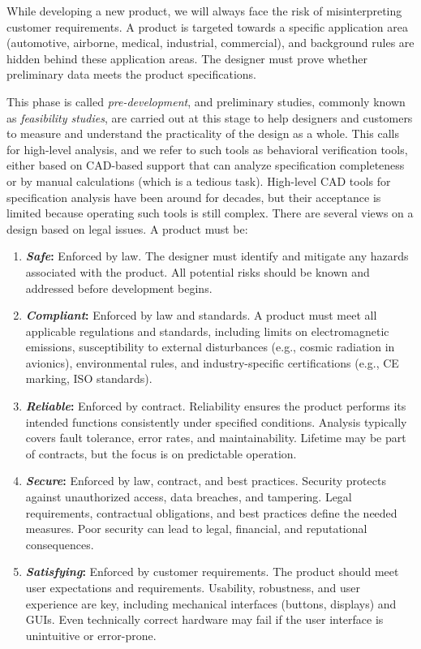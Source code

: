 While developing a new product, we will always face the risk of misinterpreting
customer requirements.
A product is targeted towards a specific application area (automotive, airborne,
medical, industrial, commercial), and background rules are hidden behind these
application areas.
The designer must prove whether preliminary data meets the product
specifications.

This phase is called \emph{pre-development}, and preliminary studies, commonly
known as \emph{feasibility studies}, are carried out at this stage to help
designers and customers to measure and understand the practicality of the
design as a whole.
This calls for high-level analysis, and we refer to such tools as behavioral
verification tools, either based on CAD-based support that can analyze
specification completeness or by manual calculations (which is a tedious task).
High-level CAD tools for specification analysis have been around for decades,
but their acceptance is limited because operating such tools is still complex.
There are several views on a design based on legal issues. A product must be:

\begin{enumerate}[topsep=8pt,itemsep=4pt,partopsep=4pt, parsep=4pt]
    \item \textbf{\emph{Safe}:} Enforced by law.
    The designer must identify and mitigate any hazards associated with the product.
    All potential risks should be known and addressed before development begins.

    \item \textbf{\emph{Compliant}:} Enforced by law and standards.
    A product must meet all applicable regulations and standards, including limits on electromagnetic emissions, susceptibility to external disturbances (e.g., cosmic radiation in avionics), environmental rules, and industry-specific certifications (e.g., CE marking, ISO standards).

    \item \textbf{\emph{Reliable}:} Enforced by contract.
    Reliability ensures the product performs its intended functions consistently under specified conditions.
    Analysis typically covers fault tolerance, error rates, and maintainability. Lifetime may be part of contracts, but the focus is on predictable operation.

    \item \textbf{\emph{Secure}:} Enforced by law, contract, and best practices.
    Security protects against unauthorized access, data breaches, and tampering.
    Legal requirements, contractual obligations, and best practices define the needed measures. Poor security can lead to legal, financial, and reputational consequences.

    \item \textbf{\emph{Satisfying}:} Enforced by customer requirements.
    The product should meet user expectations and requirements.
    Usability, robustness, and user experience are key, including mechanical interfaces (buttons, displays) and \acp{GUI}. Even technically correct hardware may fail if the user interface is unintuitive or error-prone.
\end{enumerate}
